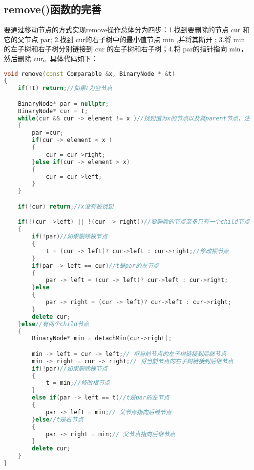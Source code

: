 \documentclass[fontset=fandol]{ctexart}
\begin{document}
\subsection{remove()函数的完善}
要通过移动节点的方式实现remove操作总体分为四步：1.找到要删除的节点 cur 和它的父节点 par; 2.找到 cur的右子树中的最小值节点 min ,并将其断开 ; 3.将 min的左子树和右子树分别链接到 cur 的左子树和右子树；4.将 par的指针指向 min，然后删除 cur。具体代码如下：
\begin{lstlisting}[language=C++, caption={remove()函数}]  
void remove(const Comparable &x, BinaryNode * &t) 
{
    if(!t) return;//如果t为空节点

    BinaryNode* par = nullptr;
    BinaryNode* cur = t;
    while(cur && cur -> element != x )//找到值为x的节点以及其parent节点，注意条件顺序
    {
        par =cur;
        if(cur -> element < x )
        {
            cur = cur->right;
        }else if(cur -> element > x)
        {
            cur = cur->left;
        }
    }

    if(!cur) return;//x没有被找到

    if(!(cur ->left) || !(cur -> right))//要删除的节点至多只有一个child节点
    {
        if(!par)//如果删除根节点
        {
            t = (cur -> left)? cur->left : cur->right;//修改根节点
        }
        if(par -> left == cur)//t是par的左节点
        {
            par -> left = (cur -> left)? cur->left : cur->right;
        }else
        {
            par -> right = (cur -> left)? cur->left : cur->right;
        }
        delete cur;
    }else//有两个child节点
    {
        BinaryNode* min = detachMin(cur->right);

        min -> left = cur -> left;// 将当前节点的左子树链接到后继节点
        min -> right = cur -> right;// 将当前节点的右子树链接到后继节点
        if(!par)//如果删除根节点
        {
            t = min;//修改根节点
        }
        else if(par -> left == t)//t是par的左节点
        {
            par -> left = min;// 父节点指向后继节点
        }else//t是右节点
        {
            par -> right = min;// 父节点指向后继节点
        }
        delete cur;
    }
}
\end{lstlisting}
\end{document}
